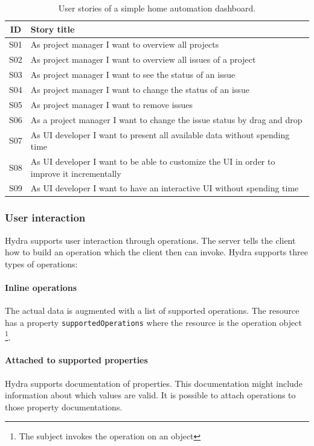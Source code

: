 \begin{table}
  \begin{center}
    \begin{tabular}{ |c|l| }
      \hline
      ID & Story title \\
      \hline
      S01 & As project manager I want to overview all projects \\
      S02 & As project manager I want to overview all issues of a project \\
      S03 & As project manager I want to see the status of an issue \\
      S04 & As project manager I want to change the status of an issue \\
      S05 & As project manager I want to remove issues \\
      S06 & As a project manager I want to change the issue status by drag and drop \\
      S07 & As UI developer I want to present all available data without spending time \\
      S08 & As UI developer I want to be able to customize the UI in order to improve it incrementally \\
      S09 & As UI developer I want to have an interactive UI without spending time \\
      \hline
    \end{tabular}
    \caption{User stories of a simple home automation dashboard.}
    \label{tab:usecase2}
  \end{center}
\end{table}

\subsubsection{User interaction}
Hydra supports user interaction through operations. The server tells the client how to build an operation which the client then can invoke. Hydra supports three types of operations:

\paragraph{Inline operations}
The actual data is augmented with a list of supported operations. The resource has a property \lstinline{supportedOperations} where the resource is the operation object \footnote{The subject invokes the operation on an object}.

\paragraph{Attached to supported properties}
Hydra supports documentation of properties. This documentation might include information about which values are valid. It is possible to attach operations to those property documentations.

